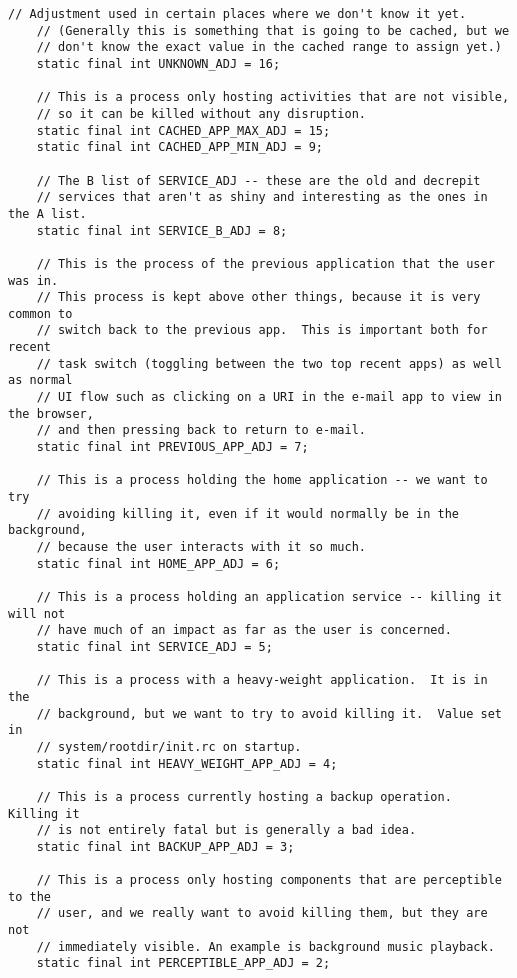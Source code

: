 \begin{lstlisting}[frame=single] 
    // Adjustment used in certain places where we don't know it yet.
    // (Generally this is something that is going to be cached, but we
    // don't know the exact value in the cached range to assign yet.)
    static final int UNKNOWN_ADJ = 16;

    // This is a process only hosting activities that are not visible,
    // so it can be killed without any disruption.
    static final int CACHED_APP_MAX_ADJ = 15;
    static final int CACHED_APP_MIN_ADJ = 9;

    // The B list of SERVICE_ADJ -- these are the old and decrepit
    // services that aren't as shiny and interesting as the ones in the A list.
    static final int SERVICE_B_ADJ = 8;

    // This is the process of the previous application that the user was in.
    // This process is kept above other things, because it is very common to
    // switch back to the previous app.  This is important both for recent
    // task switch (toggling between the two top recent apps) as well as normal
    // UI flow such as clicking on a URI in the e-mail app to view in the browser,
    // and then pressing back to return to e-mail.
    static final int PREVIOUS_APP_ADJ = 7;

    // This is a process holding the home application -- we want to try
    // avoiding killing it, even if it would normally be in the background,
    // because the user interacts with it so much.
    static final int HOME_APP_ADJ = 6;

    // This is a process holding an application service -- killing it will not
    // have much of an impact as far as the user is concerned.
    static final int SERVICE_ADJ = 5;

    // This is a process with a heavy-weight application.  It is in the
    // background, but we want to try to avoid killing it.  Value set in
    // system/rootdir/init.rc on startup.
    static final int HEAVY_WEIGHT_APP_ADJ = 4;

    // This is a process currently hosting a backup operation.  Killing it
    // is not entirely fatal but is generally a bad idea.
    static final int BACKUP_APP_ADJ = 3;

    // This is a process only hosting components that are perceptible to the
    // user, and we really want to avoid killing them, but they are not
    // immediately visible. An example is background music playback.
    static final int PERCEPTIBLE_APP_ADJ = 2;


\end{lstlisting}
